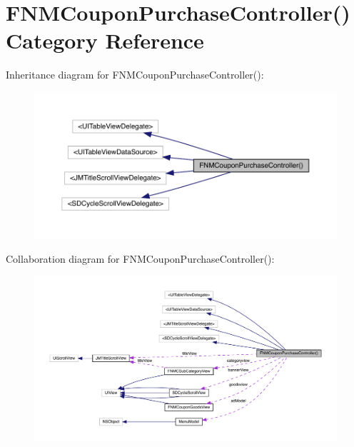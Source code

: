 \hypertarget{category_f_n_m_coupon_purchase_controller_07_08}{}\section{F\+N\+M\+Coupon\+Purchase\+Controller() Category Reference}
\label{category_f_n_m_coupon_purchase_controller_07_08}


Inheritance diagram for F\+N\+M\+Coupon\+Purchase\+Controller()\+:\nopagebreak
\begin{figure}[H]
\begin{center}
\leavevmode
\includegraphics[width=350pt]{category_f_n_m_coupon_purchase_controller_07_08__inherit__graph}
\end{center}
\end{figure}


Collaboration diagram for F\+N\+M\+Coupon\+Purchase\+Controller()\+:\nopagebreak
\begin{figure}[H]
\begin{center}
\leavevmode
\includegraphics[width=350pt]{category_f_n_m_coupon_purchase_controller_07_08__coll__graph}
\end{center}
\end{figure}
